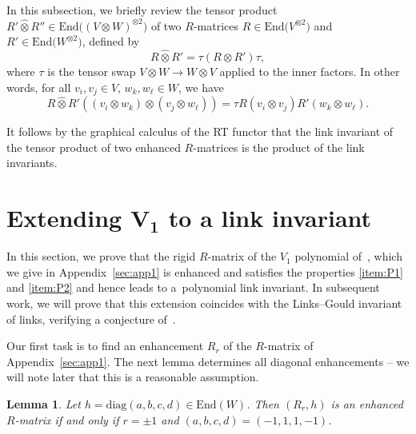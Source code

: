 \documentclass[10pt,a4paper]{amsart}
\numberwithin{equation}{section}
\newtheorem{Lemma}[Theorem]{Lemma}
\theoremstyle{definition}
\begin{document}
In this subsection, we briefly review the tensor product $R' \widehat{\otimes} R''\in
\mathrm{End}\bigl((V\otimes W)^{\otimes 2}\bigr)$ of two $R$-matrices $R \in \mathrm{End}\bigl(V^{\otimes 2}\bigr)$
and $R' \in \mathrm{End}\bigl(W^{\otimes 2}\bigr)$, defined by
\begin{equation*}%
R \widehat{\otimes} R' = \tau (R \otimes R') \tau,
\end{equation*}
where $\tau$ is the tensor swap $V\otimes W\to W\otimes V$ applied to the inner
factors. In other words, for all $v_i,v_j \in V$, $w_k, w_\ell \in W$, we have
\begin{equation*}
R \widehat{\otimes} R'((v_i \otimes w_k) \otimes (v_j \otimes w_\ell))=
\tau R(v_i \otimes v_j) R'(w_k \otimes w_\ell) .
\end{equation*}

It follows by the graphical calculus of the RT functor that the link invariant
of the tensor product of two enhanced $R$-matrices is the product of the
link invariants.

\section[Extending V\_1 to a link invariant]{Extending $\boldsymbol{V_1}$ to a link invariant}
\label{sec:V1}

In this section, we prove that the rigid $R$-matrix of the $V_1$ polynomial
of~\cite{GK:multi}, which we give in Appendix~\ref{sec:app1} is enhanced
and satisfies the properties \eqref{item:P1} and \eqref{item:P2} and hence leads
to a~polynomial link invariant.
In subsequent work, we will prove that this extension coincides with the
Links--Gould invariant of links, verifying a conjecture of~\cite{GK:multi}.

Our first task is to find an enhancement $R_{r}$ of the $R$-matrix
of Appendix~\ref{sec:app1}. The next lemma determines all diagonal enhancements
-- we will note later that this is a reasonable assumption.

\begin{Lemma}
\label{lem.V10}
Let $h=\mathrm{diag}(a,b,c,d) \in \mathrm{End}(W)$. Then $(R_{r},h)$ is an enhanced $R$-matrix
if and only if $r = \pm 1$ and $(a,b,c,d) = (-1, 1, 1, -1)$.
\end{Lemma}
\end{document}
